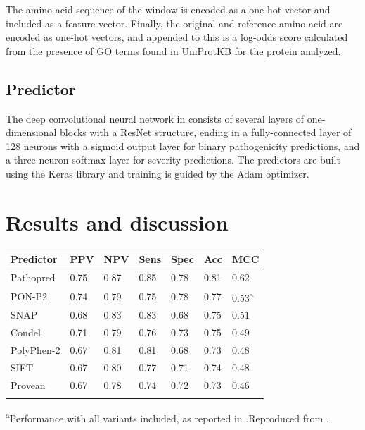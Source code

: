 \documentclass{bioinfo}
\begin{document}
\begin{methods}
The amino acid sequence of the window is encoded as a one-hot vector and included as a feature vector. Finally, the original and reference amino acid are encoded as one-hot vectors, and appended to this is a log-odds score calculated from the presence of GO terms found in UniProtKB for the protein analyzed.

\subsection{Predictor}

The deep convolutional neural network in \citep{Kvist2018} consists of several layers of one-dimensional blocks with a ResNet structure, ending in a fully-connected layer of 128 neurons with a sigmoid output layer for binary pathogenicity predictions, and a three-neuron softmax layer for severity predictions. The predictors are built using the Keras library \citep{Chollet2017} and training is guided by the Adam optimizer.

\end{methods}

\section{Results and discussion}

\begin{table}[!t]
 {\begin{tabular}{@{}lllllll@{}}\toprule 
Predictor & PPV & NPV & Sens & Spec & Acc & MCC\\\midrule
Pathopred & 0.75 & 0.87 & 0.85 & 0.78 & 0.81 & 0.62\\
PON-P2 & 0.74 & 0.79 & 0.75 & 0.78 & 0.77 & 0.53\textsuperscript{a}\\
SNAP & 0.68 & 0.83 & 0.83 & 0.68 & 0.75 & 0.51\\
Condel & 0.71 & 0.79 & 0.76 & 0.73 & 0.75 & 0.49\\
PolyPhen-2 & 0.67 & 0.81 & 0.81 & 0.68 & 0.73 & 0.48\\
SIFT & 0.67 & 0.80 & 0.77 & 0.71 & 0.74 & 0.48\\
Provean & 0.67 & 0.78 & 0.74 & 0.72 & 0.73 & 0.46\\\botrule
\end{tabular}}{\textsuperscript{a}Performance with all variants included, as reported in \citep{Niroula2015}.\newline Reproduced from \citep{Kvist2018}.}
\end{table}
\end{document}
